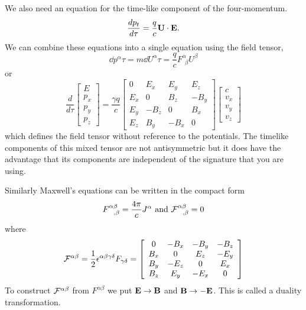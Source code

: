 We also need an equation for the time-like component of the four-momentum.
\begin{equation}
\frac{d {p_t}}{d {\tau}} = \frac{q}{c} {\bf U} \cdot {\bf E}.
\label{eq:309}
\end{equation}
We can combine these equations into a single equation using the field tensor,
\begin{equation}
\dd{p^\alpha}{\tau} = m \dd{U^\alpha}{\tau} = \frac{q}{c} F^{\alpha}_{~~\beta} U^\beta
\label{eq:310}
\end{equation}
or
\begin{equation}
\frac{d}{d\tau}
\left [ \begin{array}{c}
E \\
p_x \\
p_y \\
p_z
  \end{array}
  \right ]
= \frac{\gamma q}{c} \left [ 
\begin{array}{cccc}
0   & E_x & E_y & E_z \\
E_x &  0  & B_z & -B_y \\
E_y & -B_z &  0  & B_x \\
E_z & B_y & -B_x &  0
  \end{array}
\right ]
 \left [ \begin{array}{c}
     c \\
     v_x \\
     v_y \\
     v_z 
  \end{array}
\right ]
\end{equation}
which defines the field tensor without reference to the potentials.
The timelike components of this mixed tensor are not antisymmetric but
it does have the advantage that its components are independent of the
signature that you are using.

Similarly Maxwell's equations can be written in the compact form
\begin{equation}
F^{\alpha\beta}_{~~,\beta} = \frac{4\pi}{c} J^\alpha~\hbox{\rm and}~{\cal F}^{\alpha\beta}_{~~,\beta} = 0
\label{eq:311}
\end{equation}
where 
\begin{equation}
{\cal F}^{\alpha\beta} = \frac{1}{2} \epsilon^{\alpha\beta\gamma\delta}F_{\gamma\delta} = \left [
\begin{array}{cccc} 
0   & -B_x & -B_y & -B_z \\
B_x &    0 & E_z &  -E_y \\
B_y & -E_z  &   0  & E_x \\
B_z & E_y &  -E_x &  0
\end{array}
\right ] 
\label{eq:312}
\end{equation}
To construct ${\cal F}^{\alpha\beta}$ from $F^{\alpha\beta}$ we put
${\bf E}\rightarrow {\bf B}$ and ${\bf B}\rightarrow-{\bf E}$.  This
is called a duality transformation.

